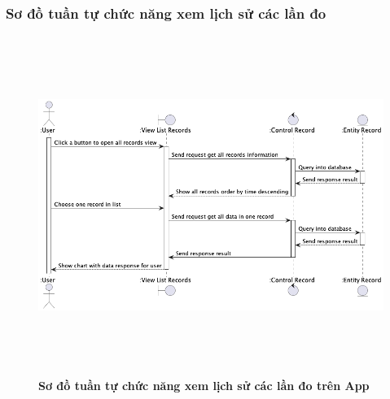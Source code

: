 \documentclass{article}%
\begin{document}
\subsubsection{Sơ đồ tuần tự chức năng xem lịch sử các lần đo}
    \begin{figure}[H]
         \centering
         \includegraphics[width=16cm,height=11cm]{Images/mobile_app/view_record_timeline.png}
         \caption[Sơ đồ tuần tự chức năng xem lịch sử các lần đo trên App]{\bfseries \fontsize{12pt}{0pt}
         \selectfont Sơ đồ tuần tự chức năng xem lịch sử các lần đo trên App}
         \label{hinh21} %
    \end{figure}
\end{document}
